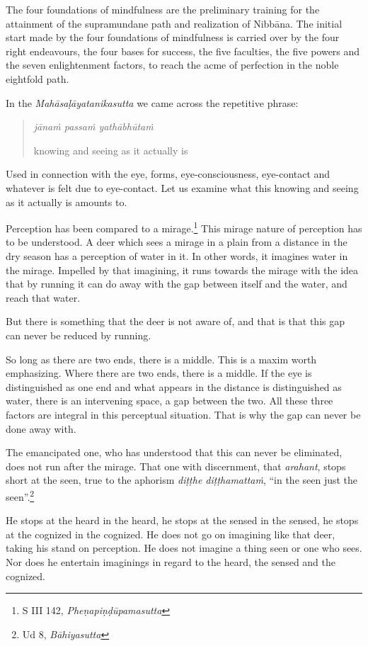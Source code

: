 The four foundations of mindfulness are the preliminary training for the attainment of the supramundane path and realization of Nibbāna. The initial start made by the four foundations of mindfulness is carried over by the four right endeavours, the four bases for success, the five faculties, the five powers and the seven enlightenment factors, to reach the acme of perfection in the noble eightfold path.

In the \emph{Mahāsaḷāyatanikasutta} we came across the repetitive phrase:

\begin{quote}
\emph{jānaṁ passaṁ yathābhūtaṁ}

knowing and seeing as it actually is
\end{quote}

Used in connection with the eye, forms, eye-consciousness, eye-contact and whatever is felt due to eye-contact. Let us examine what this knowing and seeing as it actually is amounts to.

Perception has been compared to a mirage.\footnote{S III 142, \emph{Pheṇapiṇḍūpamasutta}} This mirage nature of perception has to be understood. A deer which sees a mirage in a plain from a distance in the dry season has a perception of water in it. In other words, it imagines water in the mirage. Impelled by that imagining, it runs towards the mirage with the idea that by running it can do away with the gap between itself and the water, and reach that water.

But there is something that the deer is not aware of, and that is that this gap can never be reduced by running.

So long as there are two ends, there is a middle. This is a maxim worth emphasizing. Where there are two ends, there is a middle. If the eye is distinguished as one end and what appears in the distance is distinguished as water, there is an intervening space, a gap between the two. All these three factors are integral in this perceptual situation. That is why the gap can never be done away with.

The emancipated one, who has understood that this can never be eliminated, does not run after the mirage. That one with discernment, that \emph{arahant}, stops short at the seen, true to the aphorism \emph{diṭṭhe diṭṭhamattaṁ}, ``in the seen just the seen''.\footnote{Ud 8, \emph{Bāhiyasutta}}

He stops at the heard in the heard, he stops at the sensed in the sensed, he stops at the cognized in the cognized. He does not go on imagining like that deer, taking his stand on perception. He does not imagine a thing seen or one who sees. Nor does he entertain imaginings in regard to the heard, the sensed and the cognized.

